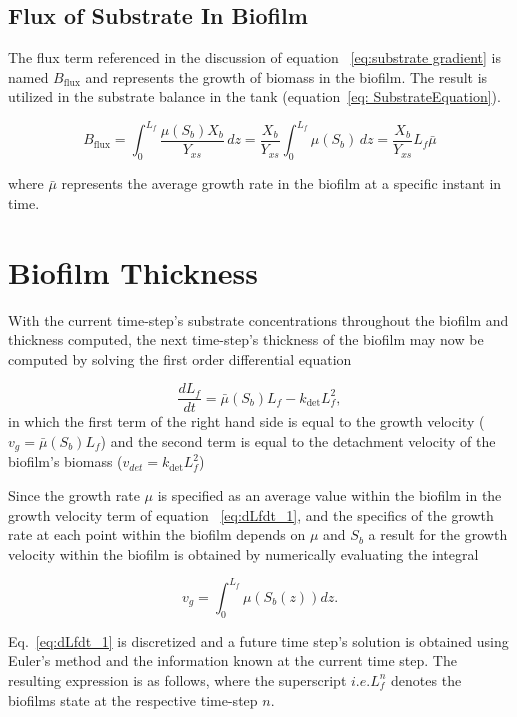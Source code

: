 \documentclass[letterpaper, twoside]{article}
\numberwithin{equation}{section}
\newcommand{\ie}{i.e.}
\begin{document}
\subsection{Flux of Substrate In Biofilm}
The flux term referenced in the discussion of equation ~\ref{eq:substrate gradient} is named $B_\mathrm{flux}$ and represents the growth of biomass in the biofilm. The result is utilized in the substrate balance in the tank (equation~\ref{eq: SubstrateEquation}).

\begin{equation} \label{eq:Bflux}
  B_\mathrm{flux} = \int_0^{L_f} \frac{\mu(S_b) X_b}{Y_{xs}} \, dz = \frac{ X_b}{Y_{xs}}\int_0^{L_f} \mu(S_b) \, dz = \frac{ X_b}{Y_{xs}} L_f \bar{\mu}
\end{equation}

where $\bar{\mu}$ represents the average growth rate in the biofilm at a specific instant in time.

\section{Biofilm Thickness}
With the current time-step's substrate concentrations throughout the biofilm and thickness computed, the next time-step's thickness of the biofilm may now be computed by solving the first order differential equation

\begin{equation}
  \label{eq:dLfdt_1}
  \frac{d L_f}{dt} = {\bar\mu(S_b) L_f}-{k_{\mathrm{det}}L_f^2},
\end{equation}
in which the first term of the right hand side is equal to the growth velocity ($v_g={\bar\mu(S_b) L_f}$) and the second term is equal to the detachment velocity of the biofilm's biomass ($v_{det}={k_{\mathrm{det}}L_f^2}$)

Since the growth rate $\mu$ is specified as an average value within the biofilm in the growth velocity term of equation ~\ref{eq:dLfdt_1}, and the specifics of the growth rate at each point within the biofilm depends on $\mu$ and $S_b$ a result for the growth velocity within the biofilm is obtained by numerically evaluating the integral 

\begin{equation}
  \label{eq:vg_int}
  {v_g}={\int_{0}^{L_f}\mu(S_b(z)) dz}.
\end{equation}

Eq.~\ref{eq:dLfdt_1} is discretized and a future time step's solution is obtained using Euler's method and the information known at the current time step. The resulting expression is as follows, where the superscript $\ie L_f^{n}$ denotes the biofilms state at the respective time-step $n$.
\end{document}
